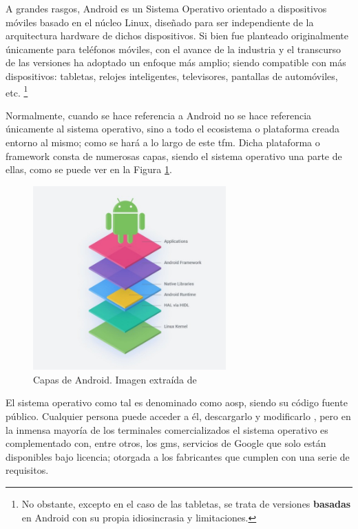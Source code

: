         A grandes rasgos, Android es un Sistema Operativo orientado a dispositivos móviles basado en el núcleo Linux, diseñado para ser independiente de la arquitectura hardware de dichos dispositivos. Si bien fue planteado originalmente únicamente para teléfonos móviles, con el avance de la industria y el transcurso de las versiones ha adoptado un enfoque más amplio; siendo compatible con más dispositivos: tabletas, relojes inteligentes, televisores, pantallas de automóviles, etc. \footnote{No obstante, excepto en el caso de las tabletas, se trata de versiones \textbf{basadas} en Android con su propia idiosincrasia y limitaciones.}
  
        Normalmente, cuando se hace referencia a Android no se hace referencia únicamente al sistema operativo, sino a todo el ecosistema o plataforma creada entorno al mismo; como se hará a lo largo de este \gls{tfm}. Dicha plataforma o \gls{framework} consta de numerosas capas, siendo el sistema operativo una parte de ellas, como se puede ver en la Figura \ref{figure:android:capas}. 

        \begin{figure}[h]
            \centering
            \includegraphics[width=0.66\textwidth]{figures/Android capas.jpg}
            \caption[Capas de Android]
            {Capas de Android. Imagen extraída de \cite{perez_aosp_2019}}
            \label{figure:android:capas}
        \end{figure}
        
        El sistema operativo como tal es denominado como \gls{aosp}, siendo su código fuente público. Cualquier persona puede acceder a él, descargarlo y modificarlo \cite{collado_que_2022}, pero en la inmensa mayoría de los terminales comercializados el sistema operativo es complementado con, entre otros, los \gls{gms}, servicios de Google que solo están disponibles bajo licencia; otorgada a los fabricantes que cumplen con una serie de requisitos. 

